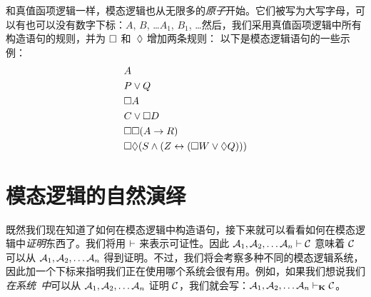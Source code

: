 和真值函项逻辑一样，模态逻辑也从无限多的\emph{原子}开始。它们被写为大写字母，可以有也可以没有数字下标：$A$, $B$, \dots  $A_1$, $B_1$, \dots 然后，我们采用真值函项逻辑中所有构造语句的规则，并为 $\Box$ 和~$\Diamond$ 增加两条规则：
以下是模态逻辑语句的一些示例：
\begin{align*}
	& A\\
	& P\vee Q\\
	& \Box A\\
	& C\vee \Box D\\
	& \Box\Box (A\rightarrow R)\\
	& \Box\Diamond (S\wedge (Z\leftrightarrow (\Box W \vee \Diamond Q)))
\end{align*}

\chapter{模态逻辑的自然演绎}
\label{Proof}

既然我们现在知道了如何在模态逻辑中构造语句，接下来就可以看看如何在模态逻辑中\emph{证明}东西了。我们将用 $\vdash$ 来表示可证性。因此 $\mathcal{A}_1,\mathcal{A}_2, \dots \mathcal{A}_n \vdash \mathcal{C}$ 意味着 $\mathcal{C}$ 可以从 $\mathcal{A}_1,\mathcal{A}_2, \dots \mathcal{A}_n$ 得到证明。不过，我们将会考察多种不同的模态逻辑系统，因此加一个下标来指明我们正在使用哪个系统会很有用。例如，如果我们想说我们\emph{在系统~\mlK 中}可以从 $\mathcal{A}_1,\mathcal{A}_2, \dots \mathcal{A}_n$ 证明 $\mathcal{C}$，我们就会写：$\mathcal{A}_1,\mathcal{A}_2, \dots \mathcal{A}_n \vdash_{\mathbf{K}} \mathcal{C}$。

